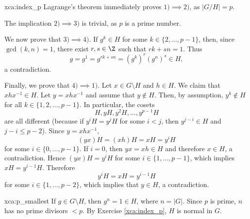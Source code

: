 \begin{sol}{xca:index_p}
Lagrange's theorem immediately proves $1)\implies 2)$, 
as $|G/H|=p$. 

The implication $2)\implies 3)$ is trivial, as $p$ is a prime number. 

We now prove that $3)\implies 4)$. If $g^k\in H$ for
some $k\in\{2,\dots,p-1\}$, then, since 
$\gcd(k,n)=1$, there exist $r,s\in\Z$ such that 
$rk+sn=1$. Thus 
\[
g=g^1=g^{rk+sn}=(g^k)^r(g^n)^s\in H,
\]
a contradiction. 

Finally, we prove that $4)\implies 1)$. Let $x\in G\setminus H$ and $h\in H$. We claim that 
$xhx^{-1}\in H$. Let $y=xhx^{-1}$ and assume that 
$y\not\in H$. Then, by assumption, 
$y^k\not\in H$ for all 
$k\in\{1,2,\dots,p-1\}$. In particular,  
the cosets 
\[
H, yH, y^2H, . . . , y^{p-1}H
\]
are all different (because if $y^iH=y^jH$ for some $i<j$, then $y^{j-i}\in H$ and $j-i\leq p-2$). Since 
$y=xhx^{-1}$, 
\[
(yx)H = (xh)H= xH= y^iH
\]
for some $i\in\{0,\dots,p-1\}$. If $i=0$, 
then $yx= xh\in H$ and therefore $x\in H$, a contradiction. Hence $(yx)H= y^iH$ for some 
$i\in\{1,\dots,p-1\}$, which implies 
$xH=y^{i-1}H$. Therefore 
\[
y^iH= xH= y^{i-1}H
\]
for some $i\in\{1,\dots,p-2\}$, which implies that 
$y\in H$, a contradiction. 
\end{sol}


\begin{sol}{xca:p_smallest}
    If $g\in G\setminus H$, then $g^n=1\in H$, where $n=|G|$. Since $p$ is prime, $n$ has no prime divisors $<p$. By Exercise \ref{xca:index_p}, $H$ is normal in $G$.
\end{sol}


